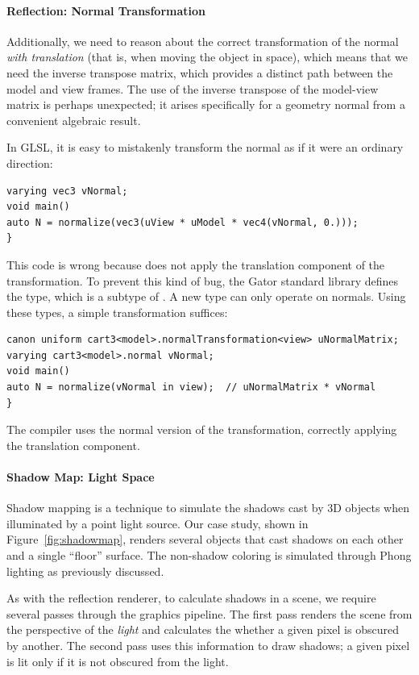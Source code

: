 \documentclass[../main.tex]{subfiles}
\begin{document}
{\paragraph{Reflection: Normal Transformation}
Additionally, we need to reason about the correct transformation of the normal \emph{with translation} (that is, when moving the object in space), which means that we need the inverse transpose matrix, which provides a distinct path between the model and view frames.  The use of the inverse transpose of the model-view matrix is perhaps unexpected; it arises specifically for a geometry normal from a convenient algebraic result.

In GLSL, it is easy to mistakenly transform the normal as if it were an ordinary direction:
%
\begin{lstlisting}
varying vec3 vNormal;
void main()
auto N = normalize(vec3(uView * uModel * vec4(vNormal, 0.)));
}
\end{lstlisting}
%
This code is wrong because  does not apply the translation component of the  transformation.
To prevent this kind of bug, the Gator standard library defines the  type, which is a subtype of .
A new  type can only operate on normals.
Using these types, a simple  transformation suffices:
%
\begin{lstlisting}
canon uniform cart3<model>.normalTransformation<view> uNormalMatrix;
varying cart3<model>.normal vNormal;
void main()
auto N = normalize(vNormal in view);  // uNormalMatrix * vNormal
}
\end{lstlisting}
%
The compiler uses the normal version of the transformation, correctly applying the translation component.

\paragraph{Shadow Map: Light Space}
Shadow mapping is a technique to simulate the shadows cast by 3D objects when illuminated by a point light source.  Our case study, shown in Figure~\ref{fig:shadowmap}, renders several objects that cast shadows on each other and a single ``floor'' surface.  The non-shadow coloring is simulated through Phong lighting as previously discussed.

As with the reflection renderer, to calculate shadows in a scene, we require several passes through the graphics pipeline.  The first pass renders the scene from the perspective of the \emph{light} and calculates the whether a given pixel is obscured by another.  The second pass uses this information to draw shadows; a given pixel is lit only if it is not obscured from the light.

}
\end{document}
